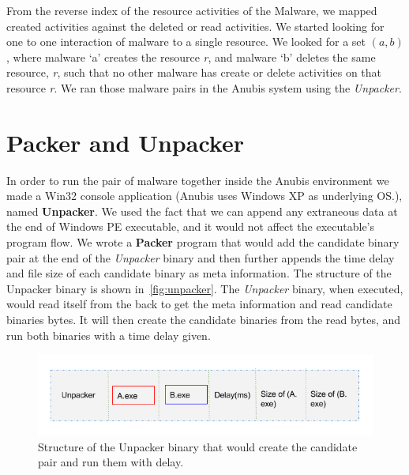 From the reverse index of the resource activities of the Malware, we mapped created activities against the deleted or read activities.
We started looking for one to one interaction of malware to a single resource.
We looked for a set $(a, b)$, where malware `a' creates the resource \emph{r}, and malware `b' deletes the same resource, \emph{r}, such that no other malware has create or delete activities on that resource \emph{r}. We ran those malware pairs in the Anubis system using the \emph{Unpacker}.
\section{Packer and Unpacker}
\label{sec:packerunpacker}
In order to run the pair of malware together inside the Anubis environment we made a Win32 console application (Anubis uses Windows XP as underlying OS.\@), named \textbf{Unpacker}.
We used the fact that we can append any extraneous data at the end of Windows PE executable, and it would not affect the executable's program flow.
We wrote a \textbf{Packer} program that would add the candidate binary pair at the end of the \emph{Unpacker} binary and then further appends the time delay and file size of each candidate binary as meta information.
The structure of the Unpacker binary is shown in~\autoref{fig:unpacker}.
The \emph{Unpacker} binary, when executed, would read itself from the back to get the meta information and read candidate binaries bytes.
It will then create the candidate binaries from the read bytes, and run both binaries with a time delay given.\\
\begin{figure}[htbp]
  \centering
  \includegraphics[scale=0.5]{figures/unpacker.png}
\caption{Structure of the Unpacker binary that would create the candidate pair and run them with delay.}
\label{fig:unpacker}
\end{figure}

